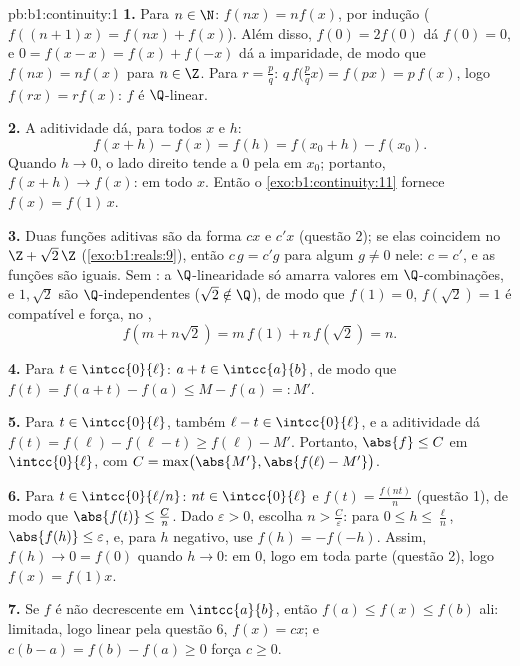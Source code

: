 \begin{solution}{pb:b1:continuity:1}
\textbf{1.} Para $n \in \N$: $f(nx) = n f(x)$, por indução
($f((n+1)x) = f(nx) + f(x)$). Além disso, $f(0) = 2f(0)$ dá $f(0) =
0$, e $0 = f(x - x) = f(x) + f(-x)$ dá a imparidade, de modo que $f(nx) =
nf(x)$ para $n \in \Z$. Para $r = \frac pq$: $q\,f\bigl(\tfrac
pq x\bigr) = f(px) = p\,f(x)$, logo $f(rx) = r f(x)$: $f$ é
$\Q$-linear.

\textbf{2.} A aditividade dá, para todos $x$ e $h$:
\[
f(x + h) - f(x) = f(h) = f(x_0 + h) - f(x_0) .
\]
Quando $h \to 0$, o lado direito tende a $0$ pela  em
$x_0$; portanto, $f(x + h) \to f(x)$:  em todo $x$. Então o
\cref{exo:b1:continuity:11} fornece $f(x) = f(1)\,x$.

\textbf{3.} Duas funções aditivas  são da forma
$cx$ e $c'x$ (questão 2); se elas coincidem no  
$\Z + \sqrt2\,\Z$ (\cref{exo:b1:reals:9}), então $c\,g = c'g$ para
algum $g \neq 0$ nele: $c = c'$, e as funções são iguais. Sem
: a $\Q$-linearidade só amarra valores em
$\Q$-combinações, e $1, \sqrt2$ são $\Q$-independentes ($\sqrt2
\notin \Q$), de modo que $f(1) = 0$, $f(\sqrt2) = 1$ é compatível e
força, no ,
\[
f(m + n\sqrt2) = m\,f(1) + n\,f(\sqrt2) = n .
\]

\textbf{4.} Para $t \in \intcc{0}{\ell}$: $a + t \in
\intcc{a}{b}$, de modo que $f(t) = f(a + t) - f(a) \leq M - f(a) =: M'$.

\textbf{5.} Para $t \in \intcc{0}{\ell}$, também $\ell - t \in
\intcc{0}{\ell}$, e a aditividade dá $f(t) = f(\ell) - f(\ell
- t) \geq f(\ell) - M'$. Portanto, $\abs{f} \leq C$ em
$\intcc{0}{\ell}$, com $C = \max\bigl(\abs{M'}, \abs{f(\ell) -
M'}\bigr)$.

\textbf{6.} Para $t \in \intcc{0}{\ell/n}$: $nt \in
\intcc{0}{\ell}$ e $f(t) = \frac{f(nt)}{n}$ (questão 1), de modo que
$\abs{f(t)} \leq \frac Cn$. Dado $\varepsilon > 0$, escolha $n >
\frac C\varepsilon$: para $0 \leq h \leq \frac\ell n$,
$\abs{f(h)} \leq \varepsilon$, e, para $h$ negativo, use $f(h) =
-f(-h)$. Assim, $f(h) \to 0 = f(0)$ quando $h \to 0$:  em $0$,
logo em toda parte (questão 2), logo $f(x) = f(1)x$.

\textbf{7.} Se $f$ é não decrescente em $\intcc{a}{b}$, então
$f(a) \leq f(x) \leq f(b)$ ali: limitada, logo linear pela questão
6, $f(x) = cx$; e $c(b - a) = f(b) - f(a) \geq 0$ força $c
\geq 0$.


\end{solution}
